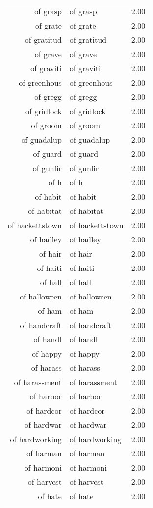 \begin{table}[ht]
\begin{tabular}{rlr}
  of grasp & of grasp & 2.00 \\ 
  of grate & of grate & 2.00 \\ 
  of gratitud & of gratitud & 2.00 \\ 
  of grave & of grave & 2.00 \\ 
  of graviti & of graviti & 2.00 \\ 
  of greenhous & of greenhous & 2.00 \\ 
  of gregg & of gregg & 2.00 \\ 
  of gridlock & of gridlock & 2.00 \\ 
  of groom & of groom & 2.00 \\ 
  of guadalup & of guadalup & 2.00 \\ 
  of guard & of guard & 2.00 \\ 
  of gunfir & of gunfir & 2.00 \\ 
  of h & of h & 2.00 \\ 
  of habit & of habit & 2.00 \\ 
  of habitat & of habitat & 2.00 \\ 
  of hackettstown & of hackettstown & 2.00 \\ 
  of hadley & of hadley & 2.00 \\ 
  of hair & of hair & 2.00 \\ 
  of haiti & of haiti & 2.00 \\ 
  of hall & of hall & 2.00 \\ 
  of halloween & of halloween & 2.00 \\ 
  of ham & of ham & 2.00 \\ 
  of handcraft & of handcraft & 2.00 \\ 
  of handl & of handl & 2.00 \\ 
  of happy & of happy & 2.00 \\ 
  of harass & of harass & 2.00 \\ 
  of harassment & of harassment & 2.00 \\ 
  of harbor & of harbor & 2.00 \\ 
  of hardcor & of hardcor & 2.00 \\ 
  of hardwar & of hardwar & 2.00 \\ 
  of hardworking & of hardworking & 2.00 \\ 
  of harman & of harman & 2.00 \\ 
  of harmoni & of harmoni & 2.00 \\ 
  of harvest & of harvest & 2.00 \\ 
  of hate & of hate & 2.00 \\ 

\end{tabular}
\end{table}
